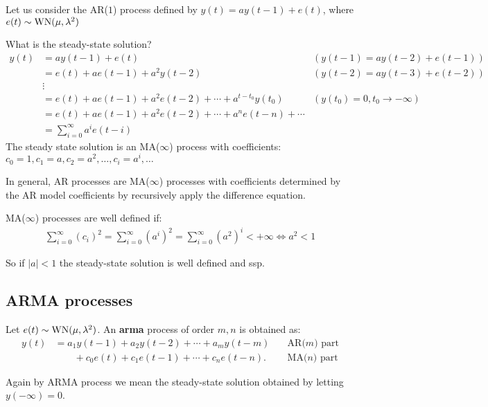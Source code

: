 \begin{exa}
Let us consider the AR($1$) process defined by $y(t)=a y(t-1)+e(t)$, where $e(t) \sim \operatorname{WN}(\mu, \lambda^{2})$

What is the steady-state solution?
\begin{align*}
	y(t) & =a y(t-1)+e(t) & (y(t-1)=a y(t-2)+e(t-1)) \\
	& =e(t)+a e(t-1)+a^{2} y(t-2) & (y(t-2)=a y(t-3)+e(t-2)) \\
	& \vdots & \\
	& =e(t)+a e(t-1)+a^{2} e(t-2)+\cdots+a^{t-t_{0}} y\left(t_{0}\right) & (y\left(t_{0}\right)=0,t_{0} \to-\infty) \\
	& =e(t)+a e(t-1)+a^{2} e(t-2)+\cdots+a^{n} e(t-n)+\cdots\\
	&=\sum_{i=0}^{\infty} a^{i} e(t-i)
\end{align*}
The steady state solution is an MA($\infty$) process with coefficients: $c_{0}=1, c_{1}=a, c_{2}=a^{2}, \ldots, c_{i}=a^{i}, \ldots$

In general, AR processes are MA($\infty$) processes with coefficients determined by the AR model coefficients by recursively apply the difference equation.

MA($\infty$) processes are well defined if:
\begin{align*}
	\sum_{i=0}^{\infty} \left(c_{i}\right)^2=\sum_{i=0}^{\infty} \left(a^{i}\right)^2=\sum_{i=0}^{\infty} \left(a^{2}\right)^i< +\infty \iff a^2< 1
\end{align*}

So if $|a|<1$ the steady-state solution is well defined and \gls{ssp}.
\end{exa}

\subsection{ARMA processes}

\begin{defn}
	Let $e(t) \sim \operatorname{WN}(\mu, \lambda^{2})$. An \textbf{\gls{arma}} process of order $m,n$ is obtained as:
	\[
		\boxed{
			\begin{aligned}
				y(t)&=a_{1} y(t-1)+a_{2} y(t-2)+\cdots+a_{m} y(t-m)\quad & \text{AR($m$) part}\\
				&\qquad+c_{0} e(t)+c_{1} e(t-1)+\cdots+c_{n} e(t-n) . \quad & \text{MA($n$) part}
			\end{aligned}
		}
	\]
\end{defn}

Again by ARMA process we mean the steady-state solution obtained by letting $y(-\infty)=0$.
 
